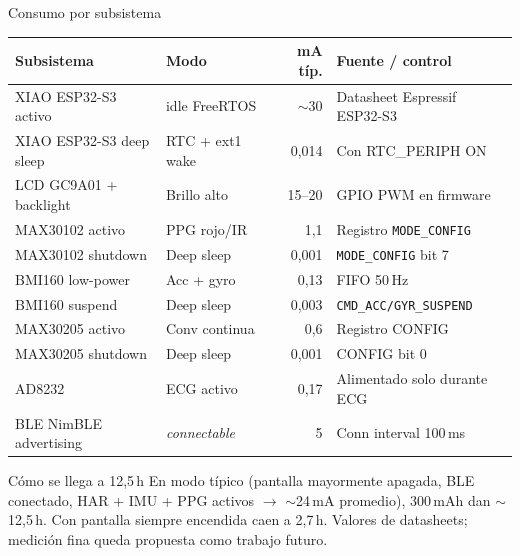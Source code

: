 \documentclass[aspectratio=169, 10pt]{beamer}
\begin{document}
\begin{frame}{Consumo por subsistema}
    \scriptsize
    \centering
    \renewcommand{\arraystretch}{1.10}
    \begin{tabular}{p{3.6cm}p{2.5cm}r p{4.4cm}}
        \toprule
        \textbf{Subsistema} & \textbf{Modo} & \textbf{mA típ.} & \textbf{Fuente / control} \\
        \midrule
        XIAO ESP32-S3 activo & idle FreeRTOS & $\sim$30    & Datasheet Espressif ESP32-S3 \\
        XIAO ESP32-S3 deep sleep & RTC + ext1 wake & 0,014 & Con RTC\_PERIPH ON \\
        LCD GC9A01 + backlight & Brillo alto & 15--20      & GPIO PWM en firmware \\
        MAX30102 activo & PPG rojo/IR & 1,1                & Registro \texttt{MODE\_CONFIG} \\
        MAX30102 shutdown & Deep sleep & 0,001            & \texttt{MODE\_CONFIG} bit 7 \\
        BMI160 low-power & Acc + gyro & 0,13              & FIFO 50\,Hz \\
        BMI160 suspend & Deep sleep & 0,003               & \texttt{CMD\_ACC/GYR\_SUSPEND} \\
        MAX30205 activo & Conv continua & 0,6             & Registro CONFIG \\
        MAX30205 shutdown & Deep sleep & 0,001            & CONFIG bit 0 \\
        AD8232 & ECG activo & 0,17                         & Alimentado solo durante ECG \\
        BLE NimBLE advertising & \emph{connectable} & 5   & Conn interval 100\,ms \\
        \bottomrule
    \end{tabular}
    \vspace{0.15cm}
    \begin{block}{Cómo se llega a 12,5\,h}
        \scriptsize En modo típico (pantalla mayormente apagada, BLE conectado, HAR + IMU + PPG activos $\rightarrow$ $\sim$24\,mA promedio), 300\,mAh dan $\sim$12,5\,h. Con pantalla siempre encendida caen a 2,7\,h. Valores de datasheets; medición fina queda propuesta como trabajo futuro.
    \end{block}
\end{frame}
\end{document}
